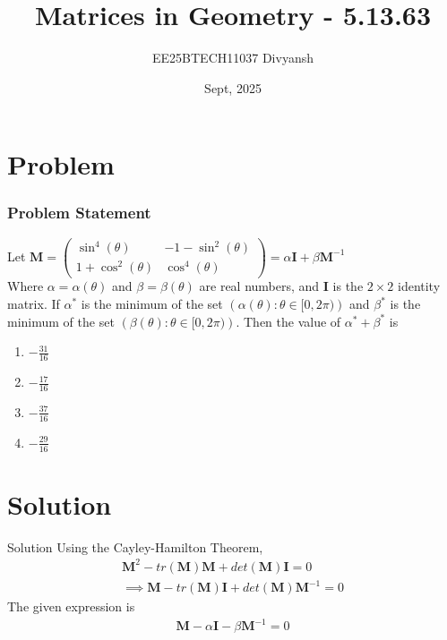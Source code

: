\documentclass{beamer}
\title{Matrices in Geometry - 5.13.63}
\author{EE25BTECH11037  Divyansh}
\date{Sept, 2025}
\renewcommand{\vec}[1]{\mathbf{#1}}
\providecommand{\brak}[1]{\ensuremath{\left(#1\right)}}
\theoremstyle{remark}
\newcommand{\myvec}[1]{\ensuremath{\begin{pmatrix}#1\end{pmatrix}}}
\begin{document}
\maketitle


\section{Problem}
\begin{frame}
\frametitle{Problem Statement}
Let $\vec{M}=\myvec{\sin^4\brak{\theta} & -1-\sin^2\brak{\theta} \\ 1+\cos^2\brak{\theta} & \cos ^4\brak{\theta}} = \alpha \vec{I} + \beta\vec{M}^{-1} $\\
Where $\alpha = \alpha\brak{\theta}$ and $\beta = \beta \brak{\theta}$ are real numbers, and $\vec{I}$ is the $2 \times 2$ identity matrix.
If $\alpha^*$ is the minimum of the set 
    $\brak{\alpha\brak{\theta}: \theta \in [0, 2\pi)} $ and $\beta^*$ is the minimum of the set
$\brak{\beta\brak{\theta} : \theta \in [0, 2\pi)}$. Then the value of $\alpha^* + \beta^*$ is
\begin{enumerate}[label=(\alph*)]
    \item $-\frac{31}{16}$
    \item $-\frac{17}{16}$
    \item $-\frac{37}{16}$
    \item $-\frac{29}{16}$
\end{enumerate}
\end{frame}

\section{Solution}
\begin{frame}{Solution}
Using the Cayley-Hamilton Theorem, 
\begin{align}
    \vec{M}^2 - tr\brak{\vec{M}}\vec{M} + det\brak{\vec{M}}\vec{I}=0\\
    \implies \vec{M} -tr\brak{\vec{M}}\vec{I} + det\brak{\vec{M}}\vec{M}^{-1} =0
\end{align}
The given expression is
\begin{align}
    \vec{M} -\alpha\vec{I} - \beta\vec{M}^{-1} =0
\end{align}
\end{frame}
\end{document}
